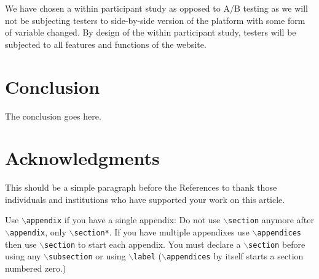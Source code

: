 \documentclass[lettersize,journal]{IEEEtran}
\begin{document}
    We have chosen a within participant study as opposed to A/B
    testing as we will not be subjecting testers to side-by-side
    version of the platform with some form of variable
    changed. By design of the within participant study,
    testers will be subjected to all features and functions of the
    website.

\section{Conclusion}
    The conclusion goes here.


\section*{Acknowledgments}
    This should be a simple paragraph before the References to thank those individuals and
    institutions who have supported your work on this article.



{
    Use $\backslash${\tt{appendix}} if you have a single appendix:
    Do not use $\backslash${\tt{section}} anymore after $\backslash${\tt{appendix}}, only $\backslash${\tt{section*}}.
    If you have multiple appendixes use $\backslash${\tt{appendices}} then use $\backslash${\tt{section}} to start each appendix.
You must declare a $\backslash${\tt{section}} before using any $\backslash${\tt{subsection}} or using $\backslash${\tt{label}} ($\backslash${\tt{appendices}} by itself
 starts a section numbered zero.)}






%
%
%
\end{document}
